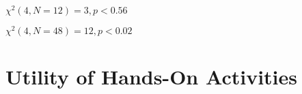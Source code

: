 























































$\chi^2(4, N=12)=3, p<0.56$







$\chi^2(4, N=48)=12, p<0.02$























































\section{Utility of Hands-On Activities}







